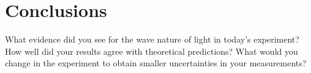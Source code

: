 \section {Conclusions} What evidence did you see for the wave nature of light in today's experiment?  How well did your results agree with theoretical predictions?  What would you change in the experiment to obtain smaller uncertainties in your measurements?

\endinput